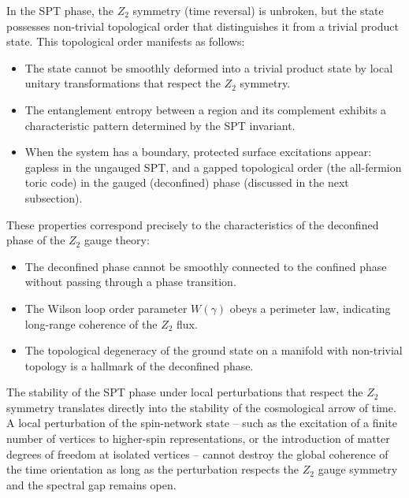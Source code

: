 \documentclass[preprint]{SciPost}
\theoremstyle{plain} %
\begin{document}
In the SPT phase, the $ Z_2 $ symmetry (time reversal) is unbroken, but the state possesses non-trivial topological order that distinguishes it from a trivial product state. This topological order manifests as follows:
\begin{itemize}
	\item The state cannot be smoothly deformed into a trivial product state by local unitary transformations that respect the $ Z_2 $ symmetry.
	\item The entanglement entropy between a region and its complement exhibits a characteristic pattern determined by the SPT invariant.
	\item When the system has a boundary, protected surface excitations appear: gapless in the ungauged SPT, and a gapped topological order (the all-fermion toric code) in the gauged (deconfined) phase (discussed in the next subsection).
\end{itemize}

These properties correspond precisely to the characteristics of the deconfined phase of the $ Z_2 $ gauge theory:
\begin{itemize}
	\item The deconfined phase cannot be smoothly connected to the confined phase without passing through a phase transition.
	\item The Wilson loop order parameter $ W(\gamma) $ obeys a perimeter law, indicating long-range coherence of the $ Z_2 $ flux.
	\item The topological degeneracy of the ground state on a manifold with non-trivial topology is a hallmark of the deconfined phase.
\end{itemize}

The stability of the SPT phase under local perturbations that respect the $ Z_2 $ symmetry translates directly into the stability of the cosmological arrow of time. A local perturbation of the spin-network state -- such as the excitation of a finite number of vertices to higher-spin representations, or the introduction of matter degrees of freedom at isolated vertices -- cannot destroy the global coherence of the time orientation as long as the perturbation respects the $ Z_2 $ gauge symmetry and the spectral gap remains open.
\end{document}
